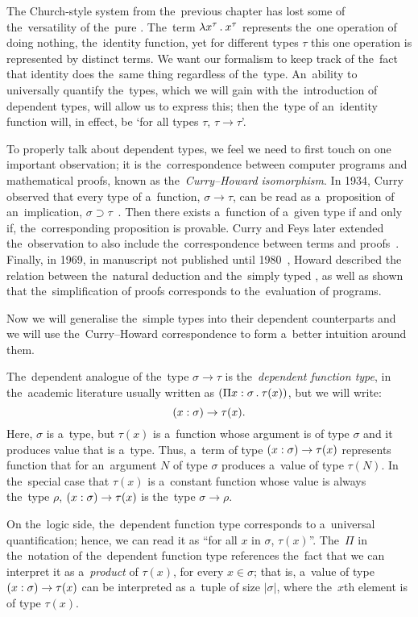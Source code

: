 
The Church-style system from the~previous chapter has lost some of
the~versatility of the~pure \lc. The~term $\lambda x^\tau \, . \: x^\tau$ represents
the~one operation of doing nothing, the~identity function, yet for different
types $\tau$ this one operation is represented by distinct terms. We want our
formalism to keep track of the~fact that identity does the~same thing regardless
of the~type. An~ability to universally quantify the~types, which we will gain
with the~introduction of dependent types, will allow us to express this; then
the~type of an~identity function will, in effect, be `for all types $\tau$,
$\tau \to \tau$'.

To properly talk about dependent types, we feel we need to first touch on one
important observation; it is the~correspondence between computer programs and
mathematical proofs, known as the~\emph{Curry–Howard isomorphism}. In 1934,
Curry observed that every type of a~function, $\sigma \to \tau$, can be read as
a~proposition of an~implication, $\sigma \supset \tau$~\cite{curry_1934}.
Then there exists a~function of a~given type if and only if, the~corresponding
proposition is provable. Curry and Feys later extended the~observation to also
include the~correspondence between terms and proofs~\cite{curry_1958}. Finally,
in 1969, in manuscript not published until 1980~\cite{howard_1980}, Howard
described the relation between the~natural deduction and the~simply typed \lc,
as well as shown that the~simplification of proofs corresponds to the~evaluation
of programs.

Now we will generalise the~simple types into their dependent counterparts and we
will use the~Curry–Howard correspondence to form a~better intuition around them.

The~dependent analogue of the~type $\sigma \to \tau$ is the~\emph{dependent
function type}, in the~academic literature usually written as ${(\Pi x \stackrel{}:
\sigma \, . \: \tau(x))}$, but we will write:
\[
  (x : \sigma) \to \tau(x).
\]
Here, $\sigma$ is a~type, but $\tau(x)$ is a~function whose argument is of type
$\sigma$ and it produces value that is a~type. Thus, a~term of type $(x : \sigma) \to \tau(x)$ represents function that for an~argument $N$ of type $\sigma$
produces a~value of type $\tau(N)$. In the~special case that $\tau(x)$ is
a~constant function whose value is always the~type $\rho$, $(x : \sigma) \to \tau(x)$ is the~type $\sigma \to \rho$.

On the~logic side, the~dependent function type corresponds to a~universal
quantification; hence, we can read it as ``for all $x$ in $\sigma$, $\tau(x)$''.
The~$\Pi$ in the~notation of the~dependent function type references the~fact
that we can interpret it as a~\emph{product} of $\tau(x)$, for every $x \in
\sigma$; that is, a~value of type $(x : \sigma) \to \tau(x)$ can be interpreted
as a~tuple of size $|\sigma|$, where the~$x$th element is of type $\tau(x)$.

